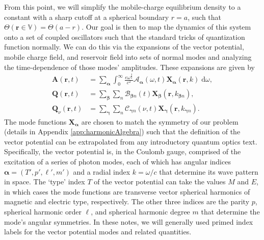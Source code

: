 \documentclass{article}
\begin{document}
From this point, we will simplify the mobile-charge equilibrium density to a constant with a sharp cutoff at a spherical boundary $r = a$, such that $\Theta(\mathbf{r}\in\mathbb{V}) = \Theta(a - r)$. Our goal is then to map the dynamics of this system onto a set of coupled oscillators such that the standard tricks of quantization function normally. We can do this via the expansions of the vector potential, mobile charge field, and reservoir field into sets of normal modes and analyzing the time-dependence of those modes' amplitudes. These expansions are given by
\begin{equation}\label{eq:fieldExpansions}
\begin{split}
\mathbf{A}(\mathbf{r},t) &= \sum_{\bm{\alpha}}\int_{0}^\infty \frac{e\omega^\frac{3}{2}}{c^2}\mathcal{A}_{\bm{\alpha}}(\omega,t)\mathbf{X}_{\bm{\alpha}}(\mathbf{r},k)\;\mathrm{d}\omega,\\
\mathbf{Q}(\mathbf{r},t) &= \sum_{\bm{\beta}}\sum_n\mathcal{B}_{\bm{\beta}n}(t)\mathbf{X}_{\bm{\beta}}(\mathbf{r},k_{\bm{\beta} n}),\\
\mathbf{Q}_\nu(\mathbf{r},t) &= \sum_{\bm{\gamma}}\sum_n\mathcal{C}_{\bm{\gamma}n}(\nu,t)\mathbf{X}_{\bm{\gamma}}(\mathbf{r},k_{\bm{\gamma} n}).
\end{split}
\end{equation}
The mode functions $\mathbf{X}_{\bm{\alpha}}$ are chosen to match the symmetry of our problem (details in Appendix \ref{app:harmonicAlgebra}) such that the definition of the vector potential can be extrapolated from any introductory quantum optics text. Specifically, the vector potential is, in the Coulomb gauge, comprised of the excitation of a series of photon modes\cite{cohen-tannoudji2004photons}, each of which has angular indices $\bm{\alpha} = (T',p',\ell',m')$ and a radial index $k = \omega/c$ that determine its wave pattern in space. The `type' index $T$ of the vector potential can take the values $M$ and $E$, in which cases the mode functions are transverse vector spherical harmonics of magnetic and electric type, respectively. The other three indices are the parity $p$, spherical harmonic order $\ell$, and spherical harmonic degree $m$ that determine the mode's angular symmetries. In these notes, we will generally used primed index labels for the vector potential modes and related quantities.

\end{document}
